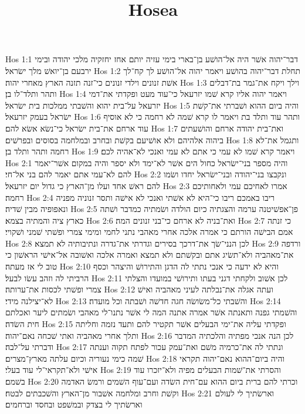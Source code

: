 

\title{Hosea}

Hos 1:1  דבר־יהוה אשׁר היה אל־הושׁע בן־בארי בימי עזיה יותם אחז יחזקיה מלכי יהודה ובימי ירבעם בן־יואשׁ מלך ישׂראל׃
Hos 1:2  תחלת דבר־יהוה בהושׁע ויאמר יהוה אל־הושׁע לך קח־לך אשׁת זנונים וילדי זנונים כי־זנה תזנה הארץ מאחרי יהוה׃
Hos 1:3  וילך ויקח את־גמר בת־דבלים ותהר ותלד־לו בן׃
Hos 1:4  ויאמר יהוה אליו קרא שׁמו יזרעאל כי־עוד מעט ופקדתי את־דמי יזרעאל על־בית יהוא והשׁבתי ממלכות בית ישׂראל׃
Hos 1:5  והיה ביום ההוא ושׁברתי את־קשׁת ישׂראל בעמק יזרעאל׃
Hos 1:6  ותהר עוד ותלד בת ויאמר לו קרא שׁמה לא רחמה כי לא אוסיף עוד ארחם את־בית ישׂראל כי־נשׂא אשׂא להם׃
Hos 1:7  ואת־בית יהודה ארחם והושׁעתים ביהוה אלהיהם ולא אושׁיעם בקשׁת ובחרב ובמלחמה בסוסים ובפרשׁים׃
Hos 1:8  ותגמל את־לא רחמה ותהר ותלד בן׃
Hos 1:9  ויאמר קרא שׁמו לא עמי כי אתם לא עמי ואנכי לא־אהיה לכם׃
Hos 2:1  והיה מספר בני־ישׂראל כחול הים אשׁר לא־ימד ולא יספר והיה במקום אשׁר־יאמר להם לא־עמי אתם יאמר להם בני אל־חי׃
Hos 2:2  ונקבצו בני־יהודה ובני־ישׂראל יחדו ושׂמו להם ראשׁ אחד ועלו מן־הארץ כי גדול יום יזרעאל׃
Hos 2:3  אמרו לאחיכם עמי ולאחותיכם רחמה׃
Hos 2:4  ריבו באמכם ריבו כי־היא לא אשׁתי ואנכי לא אישׁה ותסר זנוניה מפניה ונאפופיה מבין שׁדיה׃
Hos 2:5  פן־אפשׁיטנה ערמה והצגתיה כיום הולדה ושׂמתיה כמדבר ושׁתה כארץ ציה והמתיה בצמא׃
Hos 2:6  ואת־בניה לא ארחם כי־בני זנונים המה׃
Hos 2:7  כי זנתה אמם הבישׁה הורתם כי אמרה אלכה אחרי מאהבי נתני לחמי ומימי צמרי ופשׁתי שׁמני ושׁקויי׃
Hos 2:8  לכן הנני־שׂך את־דרכך בסירים וגדרתי את־גדרה ונתיבותיה לא תמצא׃
Hos 2:9  ורדפה את־מאהביה ולא־תשׂיג אתם ובקשׁתם ולא תמצא ואמרה אלכה ואשׁובה אל־אישׁי הראשׁון כי טוב לי אז מעתה׃
Hos 2:10  והיא לא ידעה כי אנכי נתתי לה הדגן והתירושׁ והיצהר וכסף הרביתי לה וזהב עשׂו לבעל׃
Hos 2:11  לכן אשׁוב ולקחתי דגני בעתו ותירושׁי במועדו והצלתי צמרי ופשׁתי לכסות את־ערותה׃
Hos 2:12  ועתה אגלה את־נבלתה לעיני מאהביה ואישׁ לא־יצילנה מידי׃
Hos 2:13  והשׁבתי כל־משׂושׂה חגה חדשׁה ושׁבתה וכל מועדה׃
Hos 2:14  והשׁמתי גפנה ותאנתה אשׁר אמרה אתנה המה לי אשׁר נתנו־לי מאהבי ושׂמתים ליער ואכלתם חית השׂדה׃
Hos 2:15  ופקדתי עליה את־ימי הבעלים אשׁר תקטיר להם ותעד נזמה וחליתה ותלך אחרי מאהביה ואתי שׁכחה נאם־יהוה׃
Hos 2:16  לכן הנה אנכי מפתיה והלכתיה המדבר ודברתי על־לבה׃
Hos 2:17  ונתתי לה את־כרמיה משׁם ואת־עמק עכור לפתח תקוה וענתה שׁמה כימי נעוריה וכיום עלתה מארץ־מצרים׃
Hos 2:18  והיה ביום־ההוא נאם־יהוה תקראי אישׁי ולא־תקראי־לי עוד בעלי׃
Hos 2:19  והסרתי את־שׁמות הבעלים מפיה ולא־יזכרו עוד בשׁמם׃
Hos 2:20  וכרתי להם ברית ביום ההוא עם־חית השׂדה ועם־עוף השׁמים ורמשׂ האדמה וקשׁת וחרב ומלחמה אשׁבור מן־הארץ והשׁכבתים לבטח׃
Hos 2:21  וארשׂתיך לי לעולם וארשׂתיך לי בצדק ובמשׁפט ובחסד וברחמים׃
